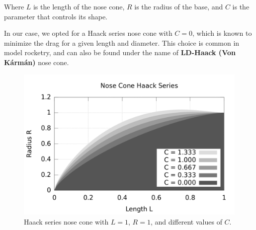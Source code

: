 Where $L$ is the length of the nose cone, $R$ is the radius of the base, and $C$ is the parameter that controls its shape.

In our case, we opted for a Haack series nose cone with $C = 0$, which is known to minimize the drag for a given length and diameter.
This choice is common in model rocketry, and can also be found under the name of \textbf{LD-Haack (Von Kármán)} nose cone.

\begin{figure}[H]
    \centering
    \includegraphics[width=.6\textwidth]{img/Nose_Cone_Haack_Series.png}
    \caption{Haack series nose cone with $L = 1$, $R = 1$, and different values of $C$.}
    \label{fig:LD_Haack_nose_cone}
\end{figure}